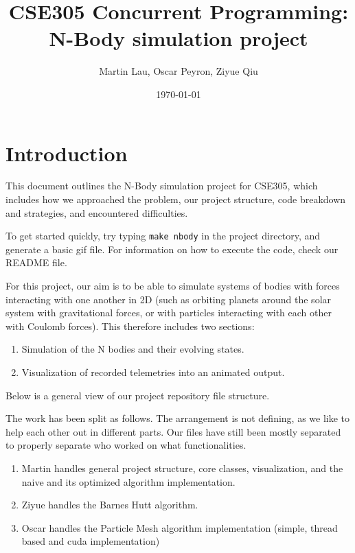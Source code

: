 \documentclass{article}
\title{CSE305 Concurrent Programming: N-Body simulation project}
\author{Martin Lau, Oscar Peyron, Ziyue Qiu}
\date{\today}
\begin{document}
\maketitle

\section{Introduction}
This document outlines the N-Body simulation project for CSE305, which includes how we approached the problem, our project structure, code breakdown and strategies, and encountered difficulties.

To get started quickly, try typing \texttt{make nbody} in the project directory, and generate a basic gif file.
For information on how to execute the code, check our README file.

For this project, our aim is to be able to simulate systems of bodies with forces interacting with one another in 2D (such as orbiting planets around the solar system with gravitational forces, or with particles interacting with each other with Coulomb forces). This therefore includes two sections:
\begin{enumerate}
    \item Simulation of the N bodies and their evolving states.
    \item Visualization of recorded telemetries into an animated output.
\end{enumerate}

Below is a general view of our project repository file structure. 

\begin{tcolorbox}[title=Project directory summary]
\end{tcolorbox}

The work has been split as follows. The arrangement is not defining, as we like to help each other out in different parts. Our files have still been mostly separated to properly separate who worked on what functionalities.
\begin{enumerate}
    \item Martin handles general project structure, core classes, visualization, and the naive and its optimized algorithm implementation.
    \item Ziyue handles the Barnes Hutt algorithm.
    \item Oscar handles the Particle Mesh algorithm implementation (simple, thread based and cuda implementation)
\end{enumerate}
\end{document}
